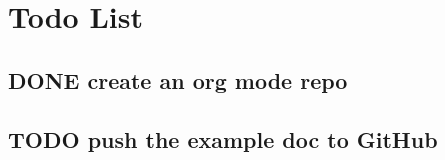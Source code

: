 \documentclass[11pt]{article}
\begin{document}
\section{Todo List}
\label{sec:org7691232}

\subsection{{\bfseries\sffamily DONE} create an org mode repo}
\label{sec:org407296a}
\subsection{{\bfseries\sffamily TODO} push the example doc to GitHub}
\label{sec:org14646d3}
\end{document}
